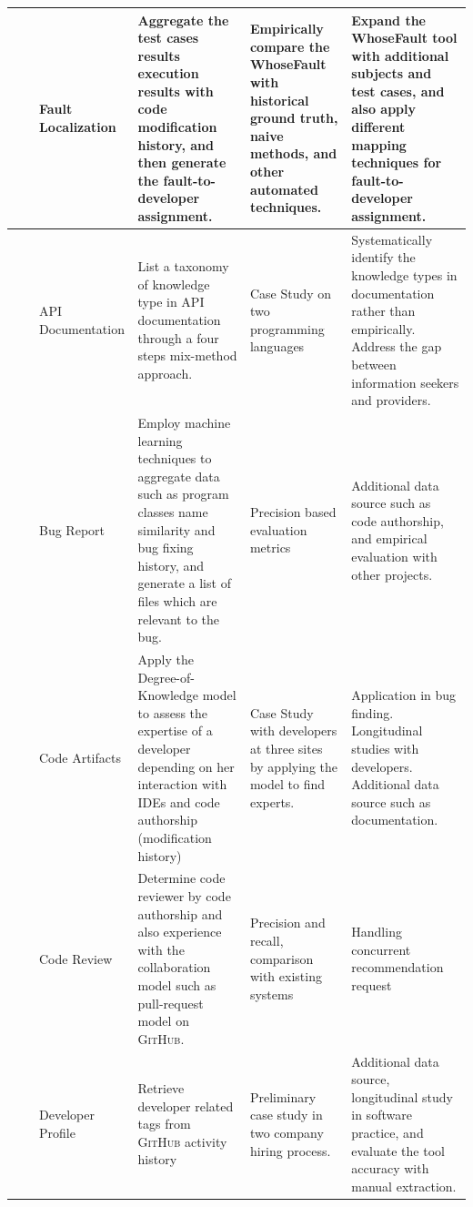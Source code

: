 \begin{table}
\begin{tabulary}{\textwidth}{|LLLLLL|}
\citeyear{servant2012whosefault} & \citeauthor{servant2012whosefault}\cite{servant2012whosefault} & Fault Localization & Aggregate the test cases results execution results with code modification history, and then generate the fault-to-developer assignment. & Empirically compare the WhoseFault with historical ground truth, naive methods, and other automated techniques. & Expand the WhoseFault tool with additional subjects and test cases, and also apply different mapping techniques for fault-to-developer assignment. \\\hline
\citeyear{maalej2013patterns} & \citeauthor{maalej2013patterns}\cite{maalej2013patterns} & API Documentation & List a taxonomy of knowledge type in API documentation through a four steps mix-method approach. & Case Study on two programming languages & Systematically identify the knowledge types in documentation rather than empirically. Address the gap between information seekers and providers.\\\hline
\citeyear{ye2014learning} & \citeauthor{ye2014learning}\cite{ye2014learning} & Bug Report & Employ machine learning techniques to aggregate data such as program classes name similarity and bug fixing history, and generate a list of files which are relevant to the bug. & Precision based evaluation metrics & Additional data source such as code authorship, and empirical evaluation with other projects.\\\hline
\citeyear{fritz2014degree} & \citeauthor{fritz2014degree}\cite{fritz2014degree} & Code Artifacts & Apply the Degree-of-Knowledge model to assess the expertise of a developer depending on her interaction with IDEs and code authorship (modification history) & Case Study with developers at three sites by applying the model to find experts. & Application in bug finding. Longitudinal studies with developers. Additional data source such as documentation. \\\hline
\citeyear{rahman2016correct} & \citeauthor{rahman2016correct}\cite{rahman2016correct} & Code Review & Determine code reviewer by code authorship and also experience with the collaboration model such as pull-request model on \textsc{GitHub}. &  Precision and recall, comparison with existing systems & Handling concurrent recommendation request\\\hline
\citeyear{greene2016cvexplorer} & \citeauthor{greene2016cvexplorer}\cite{greene2016cvexplorer} & Developer Profile & Retrieve developer related tags from \textsc{GitHub} activity history & Preliminary case study in two company hiring process. & Additional data source, longitudinal study in software practice, and evaluate the tool accuracy with manual extraction. \\\hline

\end{tabulary}
\end{table}
